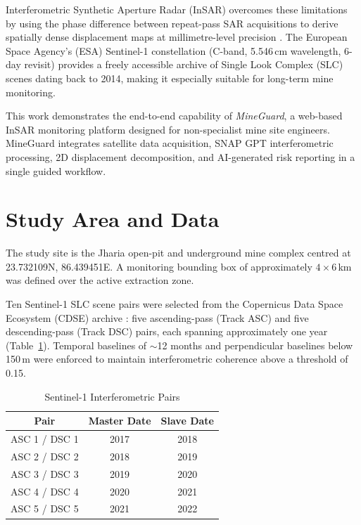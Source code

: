 \documentclass[conference]{IEEEtran}
\begin{document}
Interferometric Synthetic Aperture Radar (InSAR) overcomes these limitations
by using the phase difference between repeat-pass SAR acquisitions to derive
spatially dense displacement maps at millimetre-level precision
\cite{massonnet1998, ferretti2001}.
The European Space Agency's (ESA) Sentinel-1 constellation
(C-band, 5.546\,cm wavelength, 6-day revisit) provides a freely accessible
archive of Single Look Complex (SLC) scenes dating back to 2014, making it
especially suitable for long-term mine monitoring.

This work demonstrates the end-to-end capability of \textit{MineGuard}, a
web-based InSAR monitoring platform designed for non-specialist mine site
engineers. MineGuard integrates satellite data acquisition, SNAP GPT
interferometric processing, 2D displacement decomposition, and AI-generated
risk reporting in a single guided workflow.

\section{Study Area and Data}
The study site is the Jharia open-pit and underground mine complex centred
at 23.732109\textdegree{}N, 86.439451\textdegree{}E.
A monitoring bounding box of approximately $4 \times 6$\,km was defined over
the active extraction zone.

Ten Sentinel-1 SLC scene pairs were selected from the Copernicus Data Space
Ecosystem (CDSE) archive \cite{cdse2023}: five ascending-pass (Track ASC)
and five descending-pass (Track DSC) pairs, each spanning approximately one
year (Table~\ref{tab:pairs}).
Temporal baselines of $\sim$12 months and perpendicular baselines below
150\,m were enforced to maintain interferometric coherence above a threshold
of 0.15.

\begin{table}[h]
\caption{Sentinel-1 Interferometric Pairs}
\label{tab:pairs}
\centering
\small
\begin{tabular}{ccc}
\toprule
\textbf{Pair} & \textbf{Master Date} & \textbf{Slave Date} \\
\midrule
ASC 1 / DSC 1 & 2017 & 2018 \\
ASC 2 / DSC 2 & 2018 & 2019 \\
ASC 3 / DSC 3 & 2019 & 2020 \\
ASC 4 / DSC 4 & 2020 & 2021 \\
ASC 5 / DSC 5 & 2021 & 2022 \\
\bottomrule
\end{tabular}
\end{table}
\end{document}
